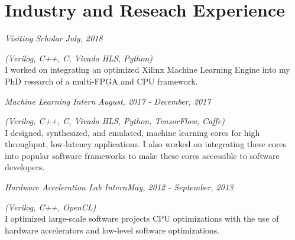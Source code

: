\section{\sc Industry and Reseach Experience}

{\em Visiting Scholar }{\em July, 2018}
{
     {\em (Verilog, C++, C, Vivado HLS, Python) } \\
     I worked on integrating an optimized Xilinx Machine Learning Engine into my PhD research of a multi-FPGA and CPU framework. 

}

{\em Machine Learning Intern }{\em August, 2017 - December, 2017}
{
     {\em (Verilog, C++, C, Vivado HLS, Python, TensorFlow, Caffe) } \\
        I designed, synthesized, and emulated,  machine learning cores for high throughput, low-latency applications. I also worked on integrating these cores into popular software frameworks to make these cores accessible to software developers. 
    
}

{\em Hardware Acceleration Lab Intern}{\em May, 2012 - September, 2013}
{
     {\em (Verilog, C++, OpenCL) } \\
        I optimized large-scale software projects CPU optimizations with the use of hardware accelerators and low-level software optimizations.
    

}
